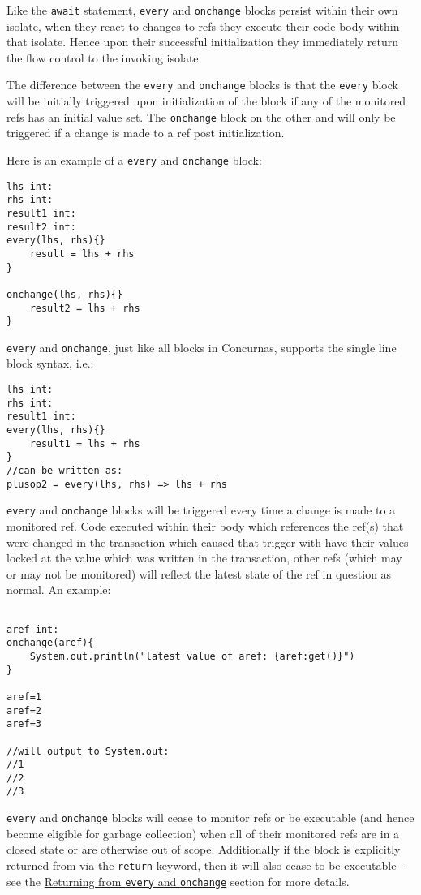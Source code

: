 \documentclass[conc-doc]{subfiles}
\begin{document}
Like the \lstinline{await} statement, \lstinline{every} and \lstinline{onchange} blocks persist within their own isolate, when they react to changes to refs they execute their code body within that isolate. Hence upon their successful initialization they immediately return the flow control to the invoking isolate.

The difference between the \lstinline{every} and \lstinline{onchange} blocks is that the \lstinline{every} block will be initially triggered upon initialization of the block if any of the monitored refs has an initial value set. The \lstinline{onchange} block on the other and will only be triggered if a change is made to a ref post initialization.

Here is an example of a \lstinline{every} and \lstinline{onchange} block:

\begin{lstlisting}
lhs int:
rhs int:
result1 int:
result2 int:
every(lhs, rhs){}
	result = lhs + rhs
}

onchange(lhs, rhs){}
	result2 = lhs + rhs
}
\end{lstlisting}

\lstinline{every} and \lstinline{onchange}, just like all blocks in Concurnas, supports the single line block syntax, i.e.:
\begin{lstlisting}
lhs int:
rhs int:
result1 int:
every(lhs, rhs){}
	result1 = lhs + rhs
}
//can be written as:
plusop2 = every(lhs, rhs) => lhs + rhs
\end{lstlisting}	

\lstinline{every} and \lstinline{onchange} blocks will be triggered every time a change is made to a monitored ref. Code executed within their body which references the ref(s) that were changed in the transaction which caused that trigger with have their values locked at the value which was written in the transaction, other refs (which may or may not be monitored) will reflect the latest state of the ref in question as normal. An example:

\begin{lstlisting}

aref int:
onchange(aref){
	System.out.println("latest value of aref: {aref:get()}")
}

aref=1
aref=2
aref=3

//will output to System.out:
//1
//2
//3
\end{lstlisting}	


\lstinline{every} and \lstinline{onchange} blocks will cease to monitor refs or be executable (and hence become eligible for garbage collection) when all of their monitored refs are in a closed state or are otherwise out of scope. Additionally if the block is explicitly returned from via the \lstinline{return} keyword, then it will also cease to be executable - see the \hyperref[subsubsec:returnEveryonechange]{Returning from \lstinline!every! and \lstinline!onchange!} section for more details.
\end{document}
